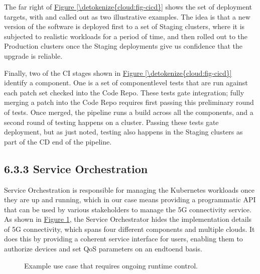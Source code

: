 \documentclass[a4paper,11pt,english]{sphinxmanual}
\let\sphinxpxdimen\pdfpxdimen\else\newdimen\sphinxpxdimen
\begin{document}
\sphinxAtStartPar
The far right of \hyperref[\detokenize{cloud:fig-cicd}]{Figure \ref{\detokenize{cloud:fig-cicd}}} shows the set of
deployment targets, with  and  called out as two
illustrative examples. The idea is that a new version of the software
is deployed first to a set of Staging clusters, where it is subjected
to realistic workloads for a period of time, and then rolled out to
the Production clusters once the Staging deployments give us
confidence that the upgrade is reliable.

\sphinxAtStartPar
Finally, two of the CI stages shown in \hyperref[\detokenize{cloud:fig-cicd}]{Figure \ref{\detokenize{cloud:fig-cicd}}}
identify a  component. One is a set of component\sphinxhyphen{}level tests
that are run against each patch set checked into the Code Repo. These
tests gate integration; fully merging a patch into the Code Repo
requires first passing this preliminary round of tests. Once merged,
the pipeline runs a build across all the components, and a second
round of testing happens on a 
cluster. Passing these tests gate deployment, but as just noted,
testing also happens in the Staging clusters as part of the CD end of
the pipeline.


\subsection{6.3.3 Service Orchestration}
\label{\detokenize{cloud:service-orchestration}}
\sphinxAtStartPar
Service Orchestration is responsible for managing the Kubernetes
workloads once they are up and running, which in our case means
providing a programmatic API that can be used by various stakeholders
to manage the 5G connectivity service. As shown in \hyperref[\detokenize{cloud:fig-control}]{Figure \ref{\detokenize{cloud:fig-control}}}, the Service Orchestrator hides the implementation
details of 5G connectivity, which spans four different components and
multiple clouds. It does this by providing a coherent service
interface for users, enabling them to authorize
devices and set QoS parameters on an end\sphinxhyphen{}to\sphinxhyphen{}end basis.

\begin{figure}[ht]
\centering
\capstart

\noindent\sphinxincludegraphics[width=400\sphinxpxdimen]{{Slide91}.png}
\caption{Example use case that requires ongoing runtime control.}\label{\detokenize{cloud:id8}}\label{\detokenize{cloud:fig-control}}\end{figure}
\end{document}
